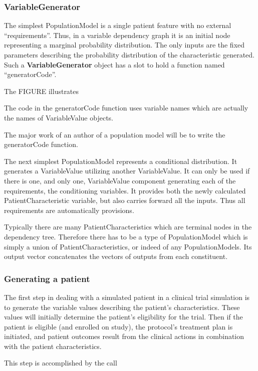 \documentclass[12pt]{amsart}
\def\code<#1>{\textbf{#1}}
\begin{document}
\subsubsection{VariableGenerator}


The simplest PopulationModel is a single patient feature with no 
external ``requirements''. 
Thus, in a variable dependency graph
it is an initial node representing a marginal probability distribution.
The only inputs are the fixed parameters 
describing the probability distribution of the characteristic generated.
Such a \code<VariableGenerator> object
has a slot to hold a function named ``generatorCode''.

The FIGURE illustrates 

The code in the generatorCode function uses variable names which are actually
the names of VariableValue objects.

The major work of an author of a population model will be to write the generatorCode function.

The next simplest PopulationModel represents a conditional distribution.
It generates a VariableValue utilizing another VariableValue.
It can only be used if there is one, and only one, VariableValue component
generating each of the requirements, the conditioning variables. It
provides both the newly calculated PatientCharacteristic variable,
but also carries forward all the inputs. Thus all requirements are 
automatically provisions.

Typically there are many PatientCharacteristics which are terminal nodes
in the dependency tree.
Therefore there has to be a type of PopulationModel which is simply
a union of PatientCharacteristics, or indeed of any PopulationModels.
Its output vector concatenates the vectors of outputs from each constituent.

\subsubsection{Generating a patient}

The first step in dealing with a simulated patient in a clinical trial simulation
is to generate the variable values describing the patient's characteristics.
These values will initially determine the patient's eligibility for the trial.
Then if the patient is eligible (and enrolled on study),
the protocol's treatment plan is initiated,
and patient outcomes result from the clinical actions in combination with the
patient characteristics.

This step is accomplished by the call
\end{document}

